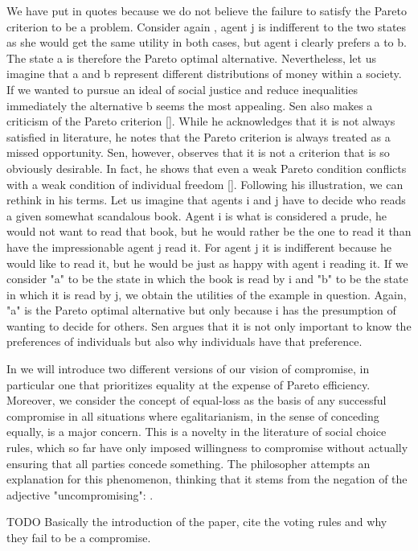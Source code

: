 We have put  in quotes because we do not believe the failure to satisfy the Pareto criterion to be a problem.
Consider again , agent j is indifferent to the two states as she would get the same utility in both cases, but agent i clearly prefers a to b. The state a is therefore the Pareto optimal alternative. Nevertheless, let us imagine that a and b represent different distributions of money within a society. If we wanted to pursue an ideal of social justice and reduce inequalities immediately the alternative b seems the most appealing.
Sen also makes a criticism of the Pareto criterion [\cite[Chapter 6]{Sen2017}]. While he acknowledges that it is not always satisfied in literature, he notes that the Pareto criterion is always treated as a missed opportunity. Sen, however, observes that it is not a criterion that is so obviously desirable. In fact, he shows that even a weak Pareto condition conflicts with a weak condition of individual freedom [\cite[Theorem 6*3]{Sen2017}].
Following his illustration, we can rethink  in his terms. Let us imagine that agents i and j have to decide who reads a given somewhat scandalous book. Agent i is what is considered a prude, he would not want to read that book, but he would rather be the one to read it than have the impressionable agent j read it. For agent j it is indifferent because he would like to read it, but he would be just as happy with agent i reading it. If we consider "a" to be the state in which the book is read by i and "b" to be the state in which it is read by j, we obtain the utilities of the example in question.
Again, "a" is the Pareto optimal alternative but only because i has the presumption of wanting to decide for others. Sen argues that it is not only important to know the preferences of individuals but also why individuals have that preference.

In  we will introduce two different versions of our vision of compromise, in particular one that prioritizes equality at the expense of Pareto efficiency. Moreover, we consider the concept of equal-loss as the basis of any successful compromise in all situations where egalitarianism, in the sense of conceding equally, is a major concern.
This is a novelty in the literature of social choice rules, which so far have only imposed willingness to compromise without actually ensuring that all parties concede something.
The philosopher \citet{Day1989} attempts an explanation for this phenomenon, thinking that it stems from the negation of the adjective "uncompromising": 
\textit{}.

TODO Basically the introduction of the paper, cite the voting rules and why they fail to be a compromise.


